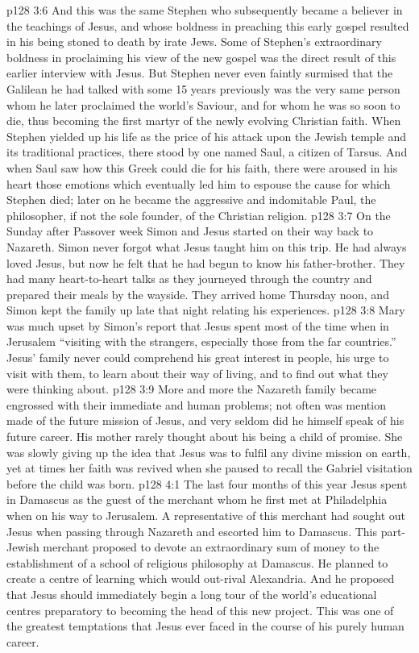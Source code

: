 \vs p128 3:6 And this was the same Stephen who subsequently became a believer in the teachings of Jesus, and whose boldness in preaching this early gospel resulted in his being stoned to death by irate Jews. Some of Stephen’s extraordinary boldness in proclaiming his view of the new gospel was the direct result of this earlier interview with Jesus. But Stephen never even faintly surmised that the Galilean he had talked with some 15 years previously was the very same person whom he later proclaimed the world’s Saviour, and for whom he was so soon to die, thus becoming the first martyr of the newly evolving Christian faith. When Stephen yielded up his life as the price of his attack upon the Jewish temple and its traditional practices, there stood by one named Saul, a citizen of Tarsus. And when Saul saw how this Greek could die for his faith, there were aroused in his heart those emotions which eventually led him to espouse the cause for which Stephen died; later on he became the aggressive and indomitable Paul, the philosopher, if not the sole founder, of the Christian religion.
\vs p128 3:7 \pc On the Sunday after Passover week Simon and Jesus started on their way back to Nazareth. Simon never forgot what Jesus taught him on this trip. He had always loved Jesus, but now he felt that he had begun to know his father\hyp{}brother. They had many heart\hyp{}to\hyp{}heart talks as they journeyed through the country and prepared their meals by the wayside. They arrived home Thursday noon, and Simon kept the family up late that night relating his experiences.
\vs p128 3:8 Mary was much upset by Simon’s report that Jesus spent most of the time when in Jerusalem “visiting with the strangers, especially those from the far countries.” Jesus’ family never could comprehend his great interest in people, his urge to visit with them, to learn about their way of living, and to find out what they were thinking about.
\vs p128 3:9 \pc More and more the Nazareth family became engrossed with their immediate and human problems; not often was mention made of the future mission of Jesus, and very seldom did he himself speak of his future career. His mother rarely thought about his being a child of promise. She was slowly giving up the idea that Jesus was to fulfil any divine mission on earth, yet at times her faith was revived when she paused to recall the Gabriel visitation before the child was born.
\vs p128 4:1 The last four months of this year Jesus spent in Damascus as the guest of the merchant whom he first met at Philadelphia when on his way to Jerusalem. A representative of this merchant had sought out Jesus when passing through Nazareth and escorted him to Damascus. This part\hyp{}Jewish merchant proposed to devote an extraordinary sum of money to the establishment of a school of religious philosophy at Damascus. He planned to create a centre of learning which would out\hyp{}rival Alexandria. And he proposed that Jesus should immediately begin a long tour of the world’s educational centres preparatory to becoming the head of this new project. This was one of the greatest temptations that Jesus ever faced in the course of his purely human career.
